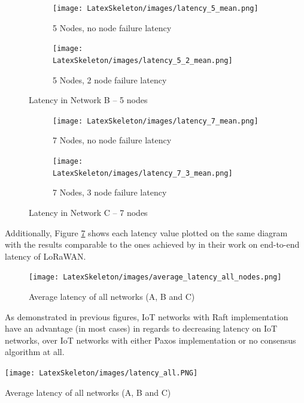 \documentclass[oneside,12pt]{book}
\begin{document}
\begin{figure}[H]
\centering
\begin{subfigure}{.5\textwidth}
  \centering
  \texttt{[image: LatexSkeleton/images/latency\_5\_mean.png]}
  \caption{5 Nodes, no node failure latency}
  \label{fig:5 Nodes, no node failure latency}
\end{subfigure}%
\begin{subfigure}{.5\textwidth}
  \centering
  \texttt{[image: LatexSkeleton/images/latency\_5\_2\_mean.png]}
  \caption{5 Nodes, 2 node failure latency}
  \label{fig:5 Nodes, 2 node failure latency}
\end{subfigure}
\caption{Latency in Network B – 5 nodes}
\label{fig:test}
\end{figure}
\begin{figure}[H]
\centering
\begin{subfigure}{.5\textwidth}
  \centering
  \texttt{[image: LatexSkeleton/images/latency\_7\_mean.png]}
  \caption{7 Nodes, no node failure latency}
  \label{fig:7 Nodes, no node failure latency}
\end{subfigure}%
\begin{subfigure}{.5\textwidth}
  \centering
  \texttt{[image: LatexSkeleton/images/latency\_7\_3\_mean.png]}
  \caption{7 Nodes, 3 node failure latency}
  \label{fig:7 Nodes, 3 node failure latency}
\end{subfigure}
\caption{Latency in Network C – 7 nodes}
\label{fig:test}
\end{figure}
Additionally, Figure \ref{fig:Average latency of all networks (A, B and C)} shows each latency value plotted on the same diagram with the results comparable to the ones achieved by \cite{8758033} in their work on end-to-end latency of LoRaWAN. 
\begin{figure}[H]
    \centering
    \texttt{[image: LatexSkeleton/images/average\_latency\_all\_nodes.png]}
    \caption{Average latency of all networks (A, B and C)}\label{fig:Average latency of all networks (A, B and C)}
\end{figure}
\noindent As demonstrated in previous figures, IoT networks with Raft implementation have an advantage (in most cases) in regards to decreasing latency on IoT networks, over IoT networks with either Paxos implementation or no consensus algorithm at all.  
\begin{table}[H]
  \centering
  \label{tbl:Average latency of all networks (A, B and C) }
  \texttt{[image: LatexSkeleton/images/latency\_all.PNG]}
  \caption{Average latency of all networks (A, B and C)}
\end{table}
\end{document}
